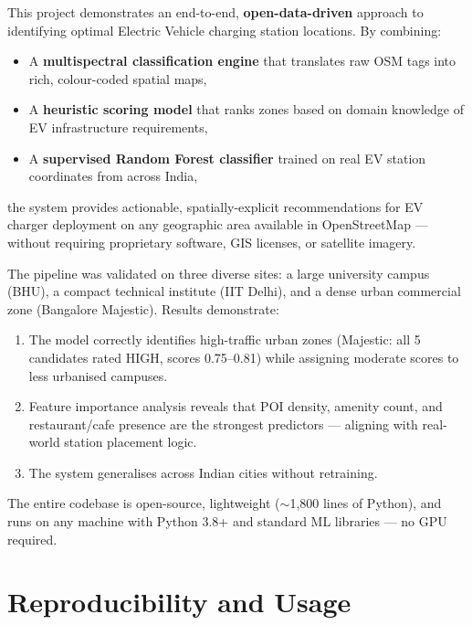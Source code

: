 \documentclass[12pt, a4paper]{article}
\begin{document}
This project demonstrates an end-to-end, \textbf{open-data-driven} 
approach to identifying optimal Electric Vehicle charging station 
locations. By combining:

\begin{itemize}
    \item A \textbf{multispectral classification engine} that 
    translates raw OSM tags into rich, colour-coded spatial maps,
    \item A \textbf{heuristic scoring model} that ranks zones based 
    on domain knowledge of EV infrastructure requirements,
    \item A \textbf{supervised Random Forest classifier} trained on 
    real EV station coordinates from across India,
\end{itemize}

\noindent the system provides actionable, spatially-explicit 
recommendations for EV charger deployment on any geographic area 
available in OpenStreetMap — without requiring proprietary software, 
GIS licenses, or satellite imagery.

The pipeline was validated on three diverse sites: a large university 
campus (BHU), a compact technical institute (IIT Delhi), and a dense 
urban commercial zone (Bangalore Majestic). Results demonstrate:

\begin{enumerate}
    \item The model correctly identifies high-traffic urban zones 
    (Majestic: all 5 candidates rated HIGH, scores 0.75--0.81) while 
    assigning moderate scores to less urbanised campuses.
    \item Feature importance analysis reveals that POI density, 
    amenity count, and restaurant/cafe presence are the strongest 
    predictors — aligning with real-world station placement logic.
    \item The system generalises across Indian cities without 
    retraining.
\end{enumerate}

The entire codebase is open-source, lightweight ($\sim$1,800 lines 
of Python), and runs on any machine with Python 3.8+ and standard 
ML libraries — no GPU required.


\section{Reproducibility and Usage}
\end{document}
